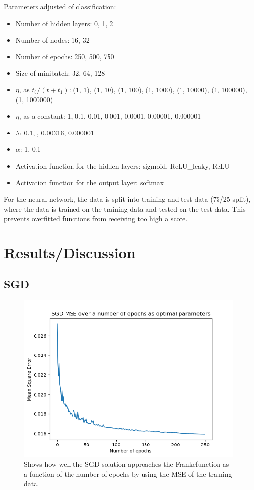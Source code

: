 \documentclass[a4paper, UKenglish]{article}
\newcommand{\0}{\mathbf{0}}
\newcommand{\1}{\mathbf{1}}
\begin{document}
Parameters adjusted of classification:
\begin{itemize}
\item Number of hidden layers: 0, 1, 2
\item Number of nodes: 16, 32
\item Number of epochs: 250, 500, 750
\item Size of minibatch: 32, 64, 128
\item $\eta$, as $t_0/(t+t_1)$: (1, 1), (1, 10), (1, 100), (1, 1000), (1, 10000),  (1, 100000), (1, 1000000)
\item $\eta$, as a constant: 1, 0.1, 0.01, 0.001, 0.0001, 0.00001, 0.000001
\item $\lambda$: 0.1, , 0.00316, 0.000001
\item $\alpha$: 1, 0.1
\item Activation function for the hidden layers: sigmoid, ReLU\_leaky, ReLU
\item Activation function for the output layer: softmax
\end{itemize}


For the neural network, the data is split into training and test data (75/25 split), where the data is trained on the training data and tested on the test data. This prevents overfitted functions from receiving too high a score.

\section{Results/Discussion}


\subsection{SGD} 
\begin{figure}[H]
        \centering 
        \includegraphics[scale=0.7]{images/partA_MSE.png} 
        \caption{Shows how well the SGD solution approaches the Frankefunction as a function of the number of epochs by using the MSE of the training data.}
        \label{fig:partA_MSE}
\end{figure}
\end{document}
